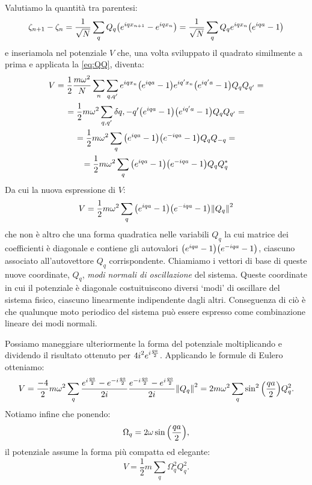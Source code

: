             Valutiamo la quantit\`a tra parentesi:
                $$\zeta_{n+1}-\zeta_n=\frac{1}{\sqrt{N}}\sum_qQ_q\qty(e^{iqx_{n+1}}-e^{iqx_n})=\frac{1}{\sqrt{N}}\sum_qQ_qe^{iqx_n}\qty(e^{iqa}-1)$$
            e inseriamola nel potenziale $V$ che, una volta sviluppato il quadrato similmente a prima e applicata la \eqref{eq:QQ}, diventa:
            \begin{multline*}
                V=\frac{1}{2}\frac{m\omega^2}{N}\sum_n\sum_{q,q'}e^{iqx_n}\qty(e^{iqa}-1)e^{iq'x_n}\bigl(e^{iq'a}-1\bigr)Q_qQ_{q'}=\\=\frac{1}{2}m\omega^2\sum_{q,q'}\delta{q,-q'}\qty(e^{iqa}-1)\bigl(e^{iq'a}-1\bigr)Q_qQ_{q'}=\\=\frac{1}{2}m\omega^2\sum_q\qty(e^{iqa}-1)\qty(e^{-iqa}-1)Q_qQ_{-q}=\\=\frac{1}{2}m\omega^2\sum_q\qty(e^{iqa}-1)\qty(e^{-iqa}-1)Q_qQ_q^*
            \end{multline*}
            Da cui la nuova espressione di $V$:
            \begin{equation}
                V=\frac{1}{2}m\omega^2\sum_q\qty(e^{iqa}-1)\qty(e^{-iqa}-1)\norm{Q_q}^2
            \end{equation}
            che non \`e altro che una forma quadratica nelle variabili $Q_q$ la cui matrice dei coefficienti \`e diagonale e contiene gli autovalori $\qty(e^{iqa}-1)\qty(e^{-iqa}-1)$, ciascuno associato all'autovettore $Q_q$ corrispondente. Chiamiamo i vettori di base di queste nuove coordinate, $Q_q$, \emph{modi normali di oscillazione} del sistema. Queste coordinate in cui il potenziale \`e diagonale costuituiscono diversi `modi' di oscillare del sistema fisico, ciascuno linearmente indipendente dagli altri. Conseguenza di ci\`o \`e che qualunque moto periodico del sistema pu\`o essere espresso come combinazione lineare dei modi normali.
            \par Possiamo maneggiare ulteriormente la forma del potenziale moltiplicando e dividendo il risultato ottenuto per $\displaystyle 4i^2e^{i\frac{qa}{2}}$. Applicando le formule di Eulero otteniamo:
                $$V=\frac{-4}{2}m\omega^2\sum_q\frac{e^{i\frac{qa}{2}}-e^{-i\frac{qa}{2}}}{2i}\frac{e^{-i\frac{qa}{2}}-e^{i\frac{qa}{2}}}{2i}\norm{Q_q}^2=2m\omega^2\sum_q\sin^2\qty(\frac{qa}{2})Q_q^2.$$
            Notiamo infine che ponendo:
            \begin{equation}
                \Omega_q=2\omega\sin\qty(\frac{qa}{2}),
                \label{eq:dispersione:1}
            \end{equation}
            il potenziale assume la forma pi\`u compatta ed elegante:
            \begin{equation}
                V=\frac{1}{2}m\sum_q\Omega_q^2Q_q^2.
                \label{eq:potenziale:3}
            \end{equation}
